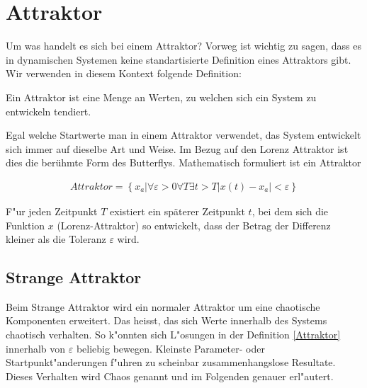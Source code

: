 \documentclass[attraktor.tex]{subfiles}
\begin{document}
	\section{Attraktor}
	Um was handelt es sich bei einem Attraktor?
	Vorweg ist wichtig zu sagen, dass es in dynamischen Systemen keine standartisierte Definition eines Attraktors gibt. Wir verwenden in diesem Kontext folgende Definition: 
	\begin{center}
		Ein Attraktor ist eine Menge an Werten, zu welchen sich ein System zu entwickeln tendiert.
	\end{center} Egal welche Startwerte man in einem Attraktor verwendet, das System entwickelt sich immer auf dieselbe Art und Weise. Im Bezug auf den Lorenz Attraktor ist dies die berühmte Form des Butterflys. Mathematisch formuliert ist ein Attraktor 
	\begin{centerFigure}
		\begin{align}
		\label{Attraktor}Attraktor = \left\{ x_a | \forall \varepsilon > 0
		\forall T \exists t > T
		|x(t) - x_a| < \varepsilon \right\} 
		\end{align}
	\end{centerFigure}
	
	F"ur jeden Zeitpunkt $T$ existiert ein späterer Zeitpunkt $t$, bei dem sich die Funktion $x$ (Lorenz-Attraktor) so entwickelt, dass der Betrag der Differenz kleiner als die Toleranz $\varepsilon$ wird.
	
	\subsection{Strange Attraktor}
	Beim Strange Attraktor wird ein normaler Attraktor um eine chaotische Komponenten erweitert. Das heisst, das sich Werte innerhalb des Systems chaotisch verhalten. So k"onnten sich L"osungen in der Definition \eqref{Attraktor} innerhalb von $\varepsilon$ beliebig bewegen. Kleinste Parameter- oder Startpunkt"anderungen f"uhren zu scheinbar zusammenhangslose Resultate. Dieses Verhalten wird Chaos genannt und im Folgenden genauer erl"autert.
	
\end{document}
